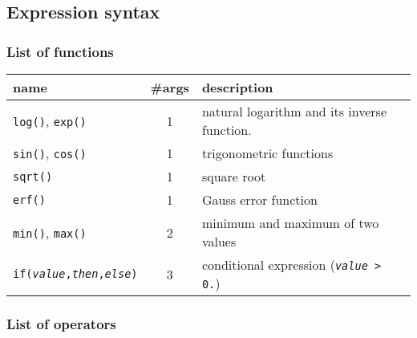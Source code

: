 \subsection{Expression syntax}

\subsubsection{List of functions}

\begin{tabular}{|l|c|p{7cm}|}
  \hline
  name                           & \#args & description \\
  \hline\hline
  \texttt{log()}, \texttt{exp()} & 1                & natural logarithm and its inverse function. \\
  \texttt{sin()}, \texttt{cos()} & 1                & trigonometric functions                     \\
  \texttt{sqrt()}                & 1                & square root                                 \\
  \texttt{erf()}                 & 1                & Gauss error function                        \\
  \texttt{min()}, \texttt{max()} & 2                & minimum and maximum of two values           \\
  \texttt{if(\textit{value},\textit{then},\textit{else})} & 3 & conditional expression 
                                                      (\texttt{\textit{value} > 0.})              \\
  \hline
\end{tabular}


\subsubsection{List of operators}

